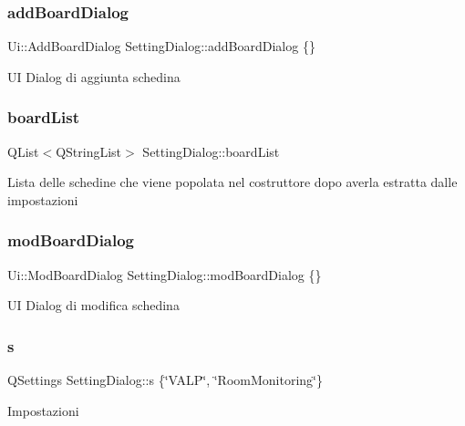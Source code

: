 \subsubsection{\texorpdfstring{add\+Board\+Dialog}{addBoardDialog}}
{\footnotesize\ttfamily Ui\+::\+Add\+Board\+Dialog Setting\+Dialog\+::add\+Board\+Dialog \{\}}

UI Dialog di aggiunta schedina \mbox{\label{class_setting_dialog_a81ccb4bb14f79aa8c5ea4bb9101b76ea}} 
\subsubsection{\texorpdfstring{board\+List}{boardList}}
{\footnotesize\ttfamily Q\+List$<$Q\+String\+List$>$ Setting\+Dialog\+::board\+List}

Lista delle schedine che viene popolata nel costruttore dopo averla estratta dalle impostazioni \mbox{\label{class_setting_dialog_afceb552be4d94b1ec42952ae82cc4533}} 
\subsubsection{\texorpdfstring{mod\+Board\+Dialog}{modBoardDialog}}
{\footnotesize\ttfamily Ui\+::\+Mod\+Board\+Dialog Setting\+Dialog\+::mod\+Board\+Dialog \{\}}

UI Dialog di modifica schedina \mbox{\label{class_setting_dialog_a1aa2c73ba5349592d93b4cf943f71f81}} 
\subsubsection{\texorpdfstring{s}{s}}
{\footnotesize\ttfamily Q\+Settings Setting\+Dialog\+::s \{\char`\"{}V\+A\+LP\char`\"{}, \char`\"{}Room\+Monitoring\char`\"{}\}}

Impostazioni \mbox{\label{class_setting_dialog_a1b223a4d8a30f6766047b2feb4f0656a}} 
